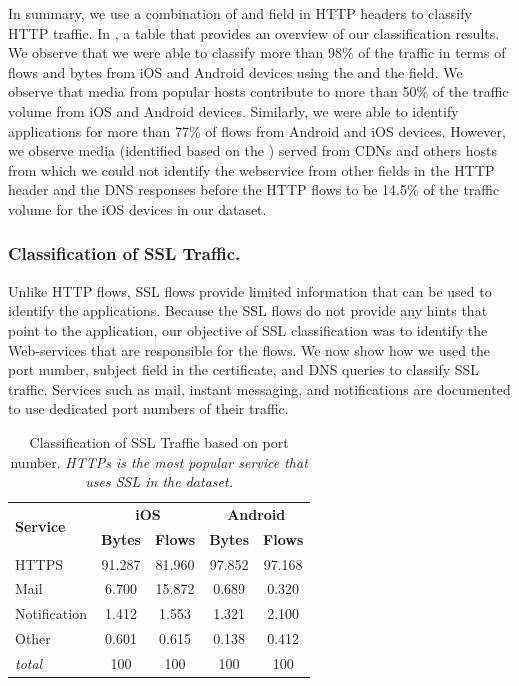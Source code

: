 In summary, we use a combination of \useragent and \httphost field in HTTP headers to classify HTTP traffic.
In , a table that provides an overview of our classification results.
We observe that we were able to classify more than 98\% of the traffic in terms of flows and bytes from iOS and Android devices using the \useragent and the \httphost field. 
We observe that media from popular hosts contribute to more than 50\% of the traffic volume from iOS and Android devices.
Similarly, we were able to identify applications for more than 77\% of flows from Android and iOS devices. 
However, we observe media (identified based on the \useragent) served from CDNs and others hosts from which we could not identify the webservice from other fields in the HTTP header and the DNS responses before the HTTP flows to be 14.5\% of the traffic volume for the iOS devices in our dataset.

\subsubsection{Classification of SSL Traffic.}

Unlike HTTP flows, SSL flows provide limited information that can be used to identify the applications. 
Because the SSL flows do not provide any hints that point to the application, our objective of SSL classification was to identify the Web-services that are responsible for the flows. 
We now show how we used the port number, subject field in the certificate, and DNS queries to classify SSL traffic. 
Services such as mail, instant messaging, and notifications are documented to use dedicated port numbers of their traffic. 

\begin{table}
\centering
\begin{small}
\begin{tabular}{|p{}|c|c|c|c|}
\hline
\multirow{2}{*}{\bf Service} & \multicolumn{2}{c|}{\bf iOS} &  \multicolumn{2}{c|}{\bf Android} \tabularnewline
\cline{2-5}
  & {\bf Bytes}  & {\bf Flows} & {\bf Bytes} & {\bf Flows} \tabularnewline
\hline
HTTPS                   & 91.287 & 81.960 & 97.852 & 97.168    \tabularnewline
\hline
Mail                    &  6.700 & 15.872 & 0.689  & 0.320  \tabularnewline
\hline
Notification            &  1.412 & 1.553  & 1.321  & 2.100  \tabularnewline
\hline
Other                   &  0.601 & 0.615  & 0.138  & 0.412 \tabularnewline
\hline
{\em total}             & 100 & 100 & 100 & 100 \tabularnewline
\hline
\end{tabular}
\end{small}
\caption{Classification of SSL Traffic based on port number. \emph{HTTPs is the most popular service that uses SSL in the \mobWild dataset.}}
\label{tab:classify-ssl-port}
\end{table}

